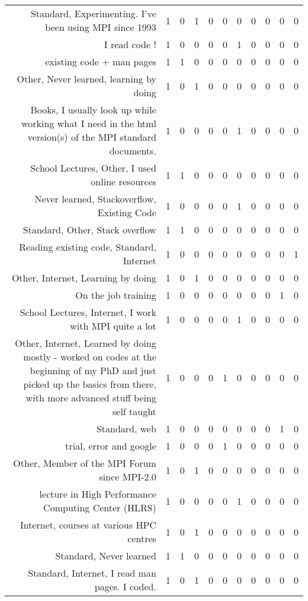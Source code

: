 {\begin{landscape}
\begin{longtable}[htb]{r|c|c|c|c|c|c|c|c|c|c}
{Standard, Experimenting. I've been using MPI since 1993} & 1 & 0 & 1 & 0 & 0 & 0 & 0 & 0 & 0 & 0 \\%
{I read code !} & 1 & 0 & 0 & 0 & 0 & 1 & 0 & 0 & 0 & 0 \\%
{existing code + man pages} & 1 & 1 & 0 & 0 & 0 & 0 & 0 & 0 & 0 & 0 \\%
{Other, Never learned, learning by doing} & 1 & 0 & 1 & 0 & 0 & 0 & 0 & 0 & 0 & 0 \\%
{Books, I usually look up while working what I need in the html version(s) of the MPI standard documents.} & 1 & 0 & 0 & 0 & 0 & 1 & 0 & 0 & 0 & 0 \\%
{School Lectures, Other, I used online resources} & 1 & 1 & 0 & 0 & 0 & 0 & 0 & 0 & 0 & 0 \\%
{Never learned, Stackoverflow, Existing Code} & 1 & 0 & 0 & 0 & 0 & 1 & 0 & 0 & 0 & 0 \\%
{Standard, Other, Stack overflow} & 1 & 1 & 0 & 0 & 0 & 0 & 0 & 0 & 0 & 0 \\%
{Reading existing code, Standard, Internet} & 1 & 0 & 0 & 0 & 0 & 0 & 0 & 0 & 0 & 1 \\%
{Other, Internet, Learning by doing} & 1 & 0 & 1 & 0 & 0 & 0 & 0 & 0 & 0 & 0 \\%
{On the job training} & 1 & 0 & 0 & 0 & 0 & 0 & 0 & 0 & 1 & 0 \\%
{School Lectures, Internet, I work with MPI quite a lot} & 1 & 0 & 0 & 0 & 0 & 1 & 0 & 0 & 0 & 0 \\%
{Other, Internet, Learned by doing mostly - worked on codes at the beginning of my PhD and just picked up the basics from there, with more advanced stuff being self taught} & 1 & 0 & 0 & 0 & 1 & 0 & 0 & 0 & 0 & 0 \\%
{Standard, web} & 1 & 0 & 0 & 0 & 0 & 0 & 0 & 0 & 1 & 0 \\%
{trial, error and google} & 1 & 0 & 0 & 0 & 1 & 0 & 0 & 0 & 0 & 0 \\%
{Other, Member of the MPI Forum since MPI-2.0} & 1 & 0 & 1 & 0 & 0 & 0 & 0 & 0 & 0 & 0 \\%
{lecture in High Performance Computing Center (HLRS)} & 1 & 0 & 0 & 0 & 0 & 1 & 0 & 0 & 0 & 0 \\%
{Internet, courses at various HPC centres} & 1 & 0 & 1 & 0 & 0 & 0 & 0 & 0 & 0 & 0 \\%
{Standard, Never learned} & 1 & 1 & 0 & 0 & 0 & 0 & 0 & 0 & 0 & 0 \\%
{Standard, Internet, I read man pages. I coded.} & 1 & 0 & 1 & 0 & 0 & 0 & 0 & 0 & 0 & 0 \\%

\end{longtable}
\end{landscape}}

